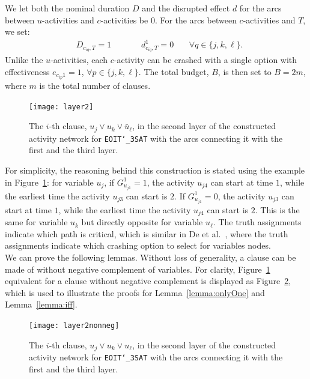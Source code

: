 \documentclass[11pt]{article}
\newcommand{\noi}{\noindent}
\begin{document}
	\newline
	We let both the nominal duration \(D\) and the disrupted effect \(d\) for the arcs between \(u\)-activities and \(c\)-activities be \(0\). For the arcs between \(c\)-activities and \(T\), we set:
	\begin{align*}
		& D_{c_{iq},T} = 1 \qquad \quad \;\; d^1_{c_{iq},T} = 0 \;\;\;\quad \forall q \in \{j,k,\ell\}.
	\end{align*}
	Unlike the \(u\)-activities, each \(c\)-activity can be crashed with a single option with effectiveness \(e_{c_{ip}1} = 1\), \(\forall p \in \{j,k,\ell\}\). The total budget, \(B\), is then set to \(B = 2m\), where \(m\) is the total number of clauses.
	\begin{figure}[H]
		\centering
		\texttt{[image: layer2]}
		\caption{The \(i\)-th clause, \(u_{j} \vee u_{k} \vee \bar{u}_{\ell}\), in the second layer of the constructed activity network for \texttt{EOIT\char`_3SAT} with the arcs connecting it with the first and the third layer.}
		\label{fig:layer2}
	\end{figure}
	\noi For simplicity, the reasoning behind this construction is stated using the example in Figure~\ref{fig:layer2}: for variable \(u_j\), if \(G^1_{u_{j1}} = 1\), the activity \(u_{j4}\) can start at time \(1\), while the earliest time the activity \(u_{j3}\) can start is \(2\). If \(G^1_{u_{j1}} = 0\), the activity \(u_{j3}\) can start at time \(1\), while the earliest time the activity \(u_{j4}\) can start is \(2\). This is the same for variable \(u_k\) but directly opposite for variable \(u_\ell\). The truth assignments indicate which path is critical, which is similar in De et al.~\cite{de1997complexity}, where the truth assignments indicate which crashing option to select for variables nodes. \\
	\newline
	We can prove the following lemmas. Without loss of generality, a clause can be made of without negative complement of variables. For clarity, Figure~\ref{fig:layer2} equivalent for a clause without negative complement is displayed as Figure~\ref{fig:layer2nonneg}, which is used to illustrate the proofs for Lemma~\ref{lemma:onlyOne} and Lemma~\ref{lemma:iff}.
	\begin{figure}[H]
		\centering
		\texttt{[image: layer2nonneg]}
		\caption{The \(i\)-th clause, \(u_{j} \vee u_{k} \vee u_{\ell}\), in the second layer of the constructed activity network for \texttt{EOIT\char`_3SAT} with the arcs connecting it with the first and the third layer.}
		\label{fig:layer2nonneg}
	\end{figure}
\end{document}
